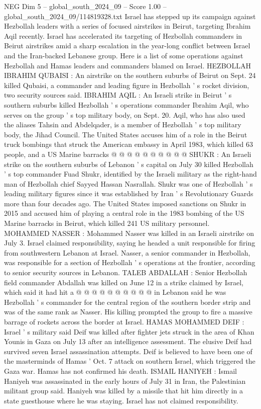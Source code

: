 \begin{textsample}{NEG Dim 5 – global\_south\_2024\_09 – Score 1.00 – global\_south\_2024\_09/114819328.txt}  \label{ex:f5_neg_198}
Israel has stepped up its campaign against Hezbollah leaders with a series of focused airstrikes in Beirut, targeting Ibrahim Aqil recently.
Israel has accelerated its targeting of Hezbollah commanders in Beirut airstrikes amid a sharp escalation in the year-long conflict between Israel and the Iran-backed Lebanese group.
Here is a list of some operations against Hezbollah and Hamas leaders and commanders blamed on Israel.
HEZBOLLAH IBRAHIM QUBAISI : An airstrike on the southern suburbs of Beirut on Sept. 24 killed Qubaisi, a commander and leading figure in Hezbollah ' s rocket division, two security sources said.
IBRAHIM AQIL : An Israeli strike in Beirut ' s southern suburbs killed Hezbollah ' s operations commander Ibrahim Aqil, who serves on the group ' s top military body, on Sept. 20.
Aqil, who has also used the aliases Tahsin and Abdelqader, is a member of Hezbollah ' s top military body, the Jihad Council.
The United States accuses him of a role in the Beirut truck bombings that struck the American embassy in April 1983, which killed 63 people, and a US Marine barracks @ @ @ @ @ @ @ @ @ @ SHUKR : An Israeli strike on the southern suburbs of Lebanon ' s capital on July 30 killed Hezbollah ' s top commander Fuad Shukr, identified by the Israeli military as the right-hand man of Hezbollah chief Sayyed Hassan Nasrallah.
Shukr was one of Hezbollah ' s leading military figures since it was established by Iran ' s Revolutionary Guards more than four decades ago.
The United States imposed sanctions on Shukr in 2015 and accused him of playing a central role in the 1983 bombing of the US Marine barracks in Beirut, which killed 241 US military personnel.
MOHAMMED NASSER : Mohammed Nasser was killed in an Israeli airstrike on July 3.
Israel claimed responsibility, saying he headed a unit responsible for firing from southwestern Lebanon at Israel.
Nasser, a senior commander in Hezbollah, was responsible for a section of Hezbollah ' s operations at the frontier, according to senior security sources in Lebanon.
TALEB ABDALLAH : Senior Hezbollah field commander Abdallah was killed on June 12 in a strike claimed by Israel, which said it had hit a @ @ @ @ @ @ @ @ @ @ in Lebanon said he was Hezbollah ' s commander for the central region of the southern border strip and was of the same rank as Nasser.
His killing prompted the group to fire a massive barrage of rockets across the border at Israel.
HAMAS MOHAMMED DEIF : Israel ' s military said Deif was killed after fighter jets struck in the area of Khan Younis in Gaza on July 13 after an intelligence assessment.
The elusive Deif had survived seven Israel assassination attempts.
Deif is believed to have been one of the masterminds of Hamas ' Oct. 7 attack on southern Israel, which triggered the Gaza war.
Hamas has not confirmed his death.
ISMAIL HANIYEH : Ismail Haniyeh was assassinated in the early hours of July 31 in Iran, the Palestinian militant group said.
Haniyeh was killed by a missile that hit him directly in a state guesthouse where he was staying.
Israel has not claimed responsibility.

\end{textsample}
